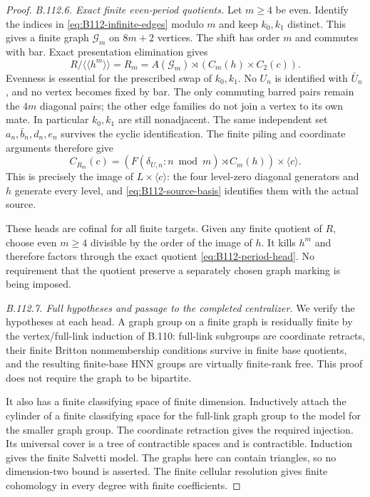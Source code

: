 \begin{proof}
\emph{B.112.6. Exact finite even-period quotients.}
Let $m\geq4$ be even. Identify the indices in
\eqref{eq:B112-infinite-edges} modulo $m$ and keep $k_0,k_1$
distinct. This gives a finite graph $\mathcal G_m$ on $8m+2$
vertices. The shift has order $m$ and commutes with bar. Exact
presentation elimination gives
\begin{equation}\label{eq:B112-period-head}
 R/\langle\!\langle h^m\rangle\!\rangle
  =R_m=A(\mathcal G_m)\rtimes(C_m(h)\times C_2(c)).
\end{equation}
Evenness is essential for the prescribed swap of $k_0,k_1$.
No $U_n$ is identified with $\bar U_n$, and no vertex becomes
fixed by bar. The only commuting barred pairs remain the $4m$
diagonal pairs; the other edge families do not join a vertex to
its own mate. In particular $k_0,k_1$ are still nonadjacent.
The same independent set $a_n,\bar b_n,d_n,e_n$ survives the
cyclic identification. The finite piling and coordinate arguments
therefore give
\begin{equation}\label{eq:B112-head-centralizer}
 C_{R_m}(c)=
       (F(\delta_{U,n}:n\bmod m)\rtimes C_m(h))
                       \times\langle c\rangle.
\end{equation}
This is precisely the image of $L\times\langle c\rangle$:
the four level-zero diagonal generators and $h$ generate every
level, and \eqref{eq:B112-source-basis} identifies them with
the actual source.

These heads are cofinal for all finite targets. Given any finite
quotient of $R$, choose even $m\geq4$ divisible by the order of
the image of $h$. It kills $h^m$ and therefore factors through
the exact quotient \eqref{eq:B112-period-head}. No requirement
that the quotient preserve a separately chosen graph marking is
being imposed.

\emph{B.112.7. Full hypotheses and passage to the completed centralizer.}
We verify the hypotheses at each head. A graph group on a finite
graph is residually finite by the vertex/full-link induction of
B.110: full-link subgroups are coordinate retracts, their finite
Britton nonmembership conditions survive in finite base quotients,
and the resulting finite-base HNN groups are virtually finite-rank
free. This proof does not require the graph to be bipartite.

It also has a finite classifying space of finite dimension.
Inductively attach the cylinder of a finite classifying space for
the full-link graph group to the model for the smaller graph group.
The coordinate retraction gives the required injection. Its universal
cover is a tree of contractible spaces and is contractible. Induction
gives the finite Salvetti model. The graphs here can contain triangles,
so no dimension-two bound is asserted. The finite cellular resolution
gives finite cohomology in every degree with finite coefficients.


\end{proof}
